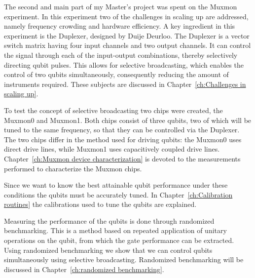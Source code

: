 \documentclass[12pt]{report}
\begin{document}
  The second and main part of my Master's project was spent on the Muxmon experiment. In this experiment two of the challenges in scaling up are addressed, namely frequency crowding and hardware efficiency. A key ingredient in this experiment is the Duplexer, designed by Duije Deurloo. The Duplexer is a vector switch matrix having four input channels and two output channels. It can control the signal through each of the input-output combinations, thereby selectively directing qubit pulses. This allows for selective broadcasting, which enables the control of two qubits simultaneously, consequently reducing the amount of instruments required. These subjects are discussed in Chapter~\ref{ch:Challenges in scaling up}.

  To test the concept of selective broadcasting two chips were created, the Muxmon0 and Muxmon1. Both chips consist of three qubits, two of which will be tuned to the same frequency, so that they can be controlled via the Duplexer. The two chips differ in the method used for driving qubits: the Muxmon0 uses direct drive lines, while Muxmon1 uses capacitively coupled drive lines. Chapter~\ref{ch:Muxmon device characterization} is devoted to the measurements performed to characterize the Muxmon chips.

  Since we want to know the best attainable qubit performance under these conditions the qubits must be accurately tuned. In Chapter~\ref{ch:Calibration routines} the calibrations used to tune the qubits are explained.

  Measuring the performance of the qubits is done through randomized benchmarking. This is a method based on repeated application of unitary operations on the qubit, from which the gate performance can be extracted. Using randomized benchmarking we show that we can control qubits simultaneously using selective broadcasting. Randomized benchmarking will be discussed in Chapter~\ref{ch:randomized benchmarking}.







\begin{appendices}



\end{appendices}



\end{document}
